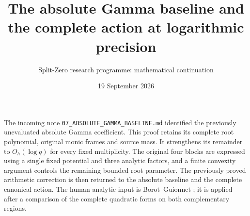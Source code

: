 \documentclass[11pt]{article}
\title{The absolute Gamma baseline and the complete action at logarithmic precision}
\author{Split-Zero research programme: mathematical continuation}
\date{19 September 2026}
\begin{document}
\maketitle

\noindent The incoming note \texttt{07\_ABSOLUTE\_GAMMA\_BASELINE.md}
identified the previously unevaluated absolute Gamma coefficient. This proof
retains its complete root polynomial, original monic frames and source mass.
It strengthens its remainder to $O_h(\log q)$ for every fixed multiplicity.
The original four blocks are expressed using a single fixed potential and
three analytic factors, and a finite convexity argument controls the remaining
bounded root parameter. The previously proved arithmetic correction is then
returned to the absolute baseline and the complete canonical action.
The human analytic input is Borot--Guionnet \cite{BG}; it is applied after
a comparison of the complete quadratic forms on both complementary regions.
\end{document}
